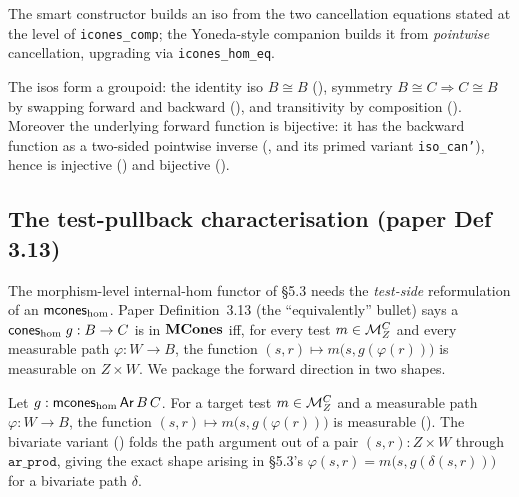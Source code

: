 The smart constructor
 builds an iso from the two
cancellation equations stated at the level of \texttt{icones\_comp};
the Yoneda-style companion
 builds it from
\emph{pointwise} cancellation, upgrading via \texttt{icones\_hom\_eq}.

\begin{lemma}\label{lem:icones-iso-groupoid}
\rocqok
{}\rocqok
{}\rocqok
{}
The isos form a groupoid: the identity iso $B \cong B$
(), symmetry $B \cong C
\Rightarrow C \cong B$ by swapping forward and backward
(), and transitivity by
composition ().
Moreover the underlying forward function is bijective: it has the
backward function as a two-sided pointwise inverse
(,
and its primed variant \texttt{iso\_can'}), hence is injective
() and bijective
().
\end{lemma}

\subsection{The test-pullback characterisation (paper Def 3.13)}%
\label{sec:test-pullback}

The morphism-level internal-hom functor of \S5.3 needs the
\emph{test-side} reformulation of an $\mathsf{mcones}_{\mathrm{hom}}$. Paper
Definition~3.13 (the ``equivalently'' bullet) says a
$\mathsf{cones}_{\mathrm{hom}}\;g : B \to C$ is in $\mathbf{MCones}$ iff, for every
test $m \in \mathcal{M}^C_Z$ and every measurable path $\varphi : W \to B$,
the function $(s, r) \mapsto m\bigl(s, g(\varphi(r))\bigr)$ is
measurable on $Z \times W$. We package the forward direction in two
shapes.

\begin{lemma}\label{lem:test-pullback-meas}
\rocqok
{}\rocqok
{}
Let $g : \mathsf{mcones}_{\mathrm{hom}}\,\mathsf{Ar}\,B\,C$. For a target test $m \in
\mathcal{M}^C_Z$ and a measurable path $\varphi : W \to B$, the function
$(s, r) \mapsto m\bigl(s, g(\varphi(r))\bigr)$ is measurable
(). The
bivariate variant
()
folds the path argument out of a pair $(s, r) : Z \times W$ through
$\texttt{ar\_prod}$, giving the exact shape arising in \S5.3's
$\varphi(s, r) = m\bigl(s, g(\delta(s, r))\bigr)$ for a bivariate path
$\delta$.
\end{lemma}

